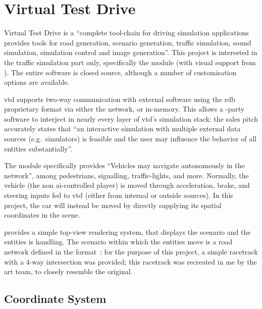 \section{Virtual Test Drive}\label{sc:software:vtd}

Virtual Test Drive is a \enquote{complete tool-chain for driving simulation applications \FONTnormal{[that]} provides tools for road generation, scenario generation, traffic simulation, sound simulation, simulation control and image generation}{\cite{software:vtd}}. This project is interested in the traffic simulation part only, specifically the  module (with visual support from ). The entire software is closed source, although a number of customisation options are available.

\gls{vtd} supports two-way communication with external software using the \gls{rdb} proprietary format via either the network, or in-memory. This allows a -party software to interject in nearly every layer of \gls{vtd}'s simulation stack: the sales pitch accurately states that \enquote{an interactive simulation with multiple external data sources (e.g.\ simulators) is feasible and the user may influence the behavior of all entities substantially}{\cite{software:vtraffic}}.

The  module specifically provides \enquote{Vehicles \FONTnormal{[that]} may navigate autonomously in the \CHARomissis{} network}{\cite{software:vtraffic}}, among pedestrians, signalling, traffic-lights, and more. Normally, the  vehicle (the non \gls{ai}-controlled player) is moved through acceleration, brake, and steering inputs fed to \gls{vtd} (either from internal or outside sources). In this project, the  car will instead be moved by directly supplying its spatial coordinates in the scene.

 provides a simple top-view rendering system, that displays the scenario and the entities  is handling. The scenario within which the entities move is a road network defined in the  format~\cite{software:opendrive}: for the purpose of this project, a simple racetrack with a 4-way intersection was provided; this racetrack was recreated in \gls{me} by the art team, to closely resemble the original.

\subsection{Coordinate System} %

